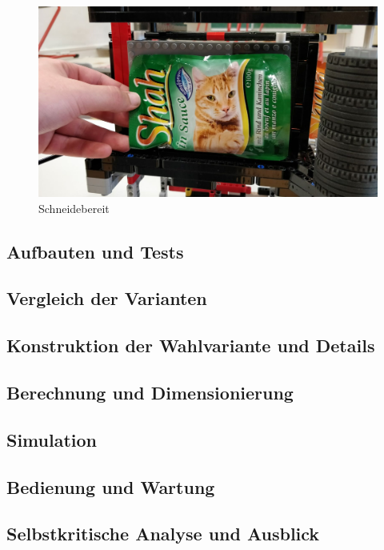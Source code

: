 \documentclass[a4paper,12pt]{scrartcl}
\begin{document}
\begin{figure}[H]
\begin{center}
\includegraphics[width=14cm]{Bilder/Ablauf_1_png/Schneidebereit.jpeg}
\caption{Schneidebereit}
\end{center}
\end{figure}

\subsection{Aufbauten und Tests}
\subsection{Vergleich der Varianten}
\subsection{Konstruktion der Wahlvariante und Details}
\subsection{Berechnung und Dimensionierung}
\subsection{Simulation}
\subsection{Bedienung und Wartung}
\subsection{Selbstkritische Analyse und Ausblick}
\end{document}
